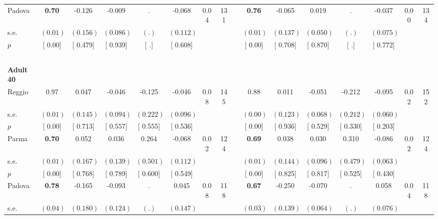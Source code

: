 \begin{longtable}{L{8em} c c c c c c c p{1em} c c c c c c c}
\quad \quad \quad Padova& \textbf{     0.70} &    -0.126 &    -0.009 &         . &    -0.068 &      0.04 &       131 & & \textbf{     0.76} &    -0.065 &     0.019 &         . &    -0.037 &      0.00 &       134  \\*
\quad \quad \quad \quad s.e.& $ (     0.01)$ & $ (    0.156)$ & $ (    0.086)$ & $ (        .)$ & $ (    0.112)$ & & & & $ (     0.01)$ & $ (    0.137)$ & $ (    0.050)$ & $ (        .)$ & $ (    0.075)$ & &  \\*
\quad \quad \quad \quad $ p$ & [     0.00] & [    0.479] & [    0.939] & [        .] & [    0.608] & & & & [     0.00] & [    0.708] & [    0.870] & [        .] & [    0.772] & &  \\[1em]
~\\[1em]
\quad \quad \textbf{Adult 40} & & & & & & & & & & & & & & & \\* 
\quad \quad \quad Reggio& 0.97 &     0.047 &    -0.046 &    -0.125 &    -0.046 &      0.08 &       145 & & 0.88 &     0.011 &    -0.051 &    -0.212 &    -0.095 &      0.02 &       152  \\*
\quad \quad \quad \quad s.e.& $ (     0.01)$ & $ (    0.145)$ & $ (    0.094)$ & $ (    0.222)$ & $ (    0.096)$ & & & & $ (     0.00)$ & $ (    0.123)$ & $ (    0.068)$ & $ (    0.212)$ & $ (    0.060)$ & &  \\*
\quad \quad \quad \quad $ p$ & [     0.00] & [    0.713] & [    0.557] & [    0.555] & [    0.536] & & & & [     0.00] & [    0.936] & [    0.529] & [    0.330] & [    0.203] & &  \\[1em]
\quad \quad \quad Parma& \textbf{     0.70} &     0.052 &     0.036 &     0.264 &    -0.068 &      0.02 &       124 & & \textbf{     0.69} &     0.038 &     0.030 &     0.310 &    -0.086 &      0.02 &       124  \\*
\quad \quad \quad \quad s.e.& $ (     0.01)$ & $ (    0.167)$ & $ (    0.139)$ & $ (    0.501)$ & $ (    0.112)$ & & & & $ (     0.01)$ & $ (    0.144)$ & $ (    0.096)$ & $ (    0.479)$ & $ (    0.063)$ & &  \\*
\quad \quad \quad \quad $ p$ & [     0.00] & [    0.768] & [    0.789] & [    0.600] & [    0.549] & & & & [     0.00] & [    0.825] & [    0.817] & [    0.525] & [    0.430] & &  \\[1em]
\quad \quad \quad Padova& \textbf{     0.78} &    -0.165 &    -0.093 &         . &     0.045 &      0.08 &       118 & & \textbf{     0.67} &    -0.250 &    -0.070 &         . &     0.058 &      0.04 &       118  \\*
\quad \quad \quad \quad s.e.& $ (     0.04)$ & $ (    0.180)$ & $ (    0.124)$ & $ (        .)$ & $ (    0.147)$ & & & & $ (     0.03)$ & $ (    0.139)$ & $ (    0.064)$ & $ (        .)$ & $ (    0.076)$ & &  \\*

\end{longtable}
